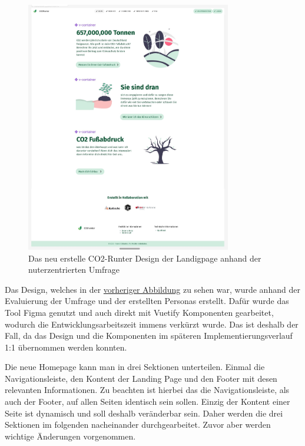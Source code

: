 \begin{figure}[H]
    \centering
    \includegraphics[width=0.8\textwidth]{images/06/HomePage-Design.jpeg}
    \caption{Das neu erstelle CO2-Runter Design der Landigpage anhand der nuterzentrierten Umfrage}
    \label{fig:new-co2runter-homepage-design}
\end{figure}

Das Design, welches in der \hyperref[fig:new-co2runter-homepage-design]{vorheriger Abbildung} zu sehen war, wurde anhand der Evaluierung der Umfrage und der erstellten Personas erstellt.
Dafür wurde das Tool Figma genutzt und auch direkt mit Vuetify Komponenten gearbeitet, wodurch die Entwicklungsarbeitszeit immens verkürzt wurde.
Das ist deshalb der Fall, da das Design und die Komponenten im späteren Implementierungsverlauf 1:1 übernommen werden konnten.

Die neue Homepage kann man in drei Sektionen unterteilen.
Einmal die Navigationsleiste, den Kontent der Landing Page und den Footer mit desen relevanten Informationen.
Zu beachten ist hierbei das die Navigationsleiste, als auch der Footer, auf allen Seiten identisch sein sollen.
Einzig der Kontent einer Seite ist dynamisch und soll deshalb veränderbar sein.
Daher werden die drei Sektionen im folgenden nacheinander durchgearbeitet.
Zuvor aber werden wichtige Änderungen vorgenommen.

